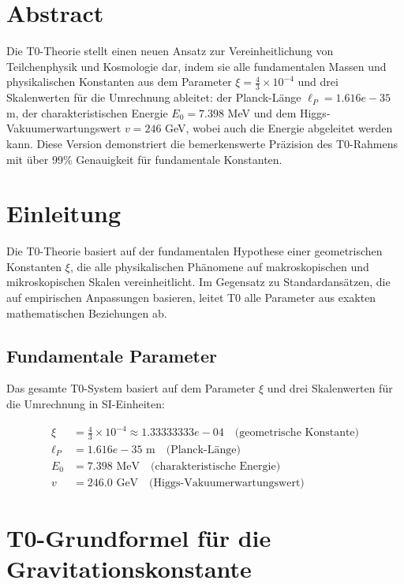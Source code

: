 \section*{Abstract}
		Die T0-Theorie stellt einen neuen Ansatz zur Vereinheitlichung von Teilchenphysik und Kosmologie dar, indem sie alle fundamentalen Massen und physikalischen Konstanten aus dem Parameter $\xi = \frac{4}{3} \times 10^{-4}$ und drei Skalenwerten für die Umrechnung ableitet: der Planck-Länge $\ell_P = 1.616e-35$ m, der charakteristischen Energie $E_0 = 7.398$ MeV und dem Higgs-Vakuumerwartungswert $v = 246$ GeV, wobei auch die Energie abgeleitet werden kann. Diese Version demonstriert die bemerkenswerte Präzision des T0-Rahmens mit über 99\% Genauigkeit für fundamentale Konstanten.

	
	\section{Einleitung}
	
	Die T0-Theorie basiert auf der fundamentalen Hypothese einer geometrischen Konstanten $\xi$, die alle physikalischen Phänomene auf makroskopischen und mikroskopischen Skalen vereinheitlicht. Im Gegensatz zu Standardansätzen, die auf empirischen Anpassungen basieren, leitet T0 alle Parameter aus exakten mathematischen Beziehungen ab.
	
	\subsection{Fundamentale Parameter}
	
	Das gesamte T0-System basiert auf dem Parameter $\xi$ und drei Skalenwerten für die Umrechnung in SI-Einheiten:
	
	\begin{align}
		\xi &= \frac{4}{3} \times 10^{-4} \approx 1.33333333e-04 \quad \text{(geometrische Konstante)} \\
		\ell_P &= 1.616e-35 \text{ m} \quad \text{(Planck-Länge)} \\
		E_0 &= 7.398 \text{ MeV} \quad \text{(charakteristische Energie)} \\
		v &= 246.0 \text{ GeV} \quad \text{(Higgs-Vakuumerwartungswert)}
	\end{align}
	
	\section{T0-Grundformel für die Gravitationskonstante}
	
